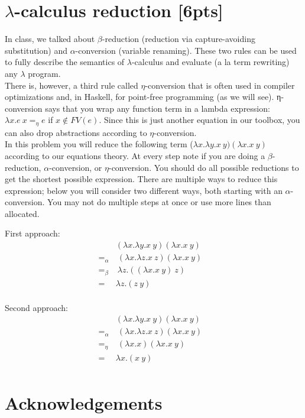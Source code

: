 \documentclass{article}
\begin{document}
\section{$\lambda$-calculus reduction [6pts]}
In class, we talked about $\beta$-reduction (reduction via capture-avoiding
substitution) and $\alpha$-conversion (variable
renaming). These two rules can be used to fully describe the semantics of
$\lambda$-calculus and evaluate (a la term
rewriting) any $\lambda$ program.\\
There is, however, a third rule called $\eta$-conversion that is often used in
compiler optimizations and, in
Haskell, for point-free programming (as we will see). η-conversion says that you
wrap any function term in a
lambda expression: $\lambda x.e\ x =_\eta e$ if $x \notin FV(e)$. Since this is just another
equation in our toolbox, you can
also drop abstractions according to $\eta$-conversion.\\
In this problem you will reduce the following term ($\lambda x.\lambda y.x\ 
y)(\lambda x.x\ y)$ according
to our equations theory.
At every step note if you are doing a $\beta$-reduction, $\alpha$-conversion, or
$\eta$-conversion. You should do all possible
reductions to get the shortest possible expression. There are multiple ways to
reduce this expression; below
you will consider two different ways, both starting with an $\alpha$-conversion. You
may not do multiple steps at
once or use more lines than allocated.
\par First approach:
	\begin{align*}
		&(\lambda x.\lambda y.x\ y)(\lambda x.x\ y)&\\
		=_\alpha&\ (\lambda x.\lambda z.x\ z)(\lambda x.x\ y)&\\
		=_\beta&\ \lambda z.((\lambda x.x\ y)\ z)&\\
		=&\lambda z.(z\ y)&\\
	\end{align*}

\par Second approach:
	\begin{align*}
		&(\lambda x.\lambda y.x\ y)(\lambda x.x\ y)&\\
		=_\alpha&\ (\lambda x.\lambda z.x\ z)(\lambda x.x\ y)&\\
		=_\eta&\ (\lambda x.x)(\lambda x.x\ y)&\\
		=&\lambda x.(x\ y)&\\
	\end{align*}

\section*{Acknowledgements}
\end{document}
